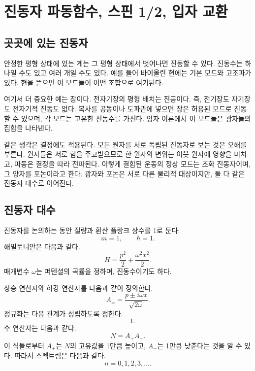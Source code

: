 \chapter{진동자 파동함수, 스핀 1/2, 입자 교환}

\section{곳곳에 있는 진동자}

안정한 평형 상태에 있는 계는 그 평형 상태에서 벗어나면 진동할 수 있다. 진동수는 하나일 수도 있고 여러 개일 수도 있다. 예를 들어 바이올린 현에는 기본 모드와 고조파가 있다. 현을 뜯으면 이 모드들이 어떤 조합으로 여기된다.

여기서 더 중요한 예는 장이다. 전자기장의 평형 배치는 진공이다. 즉, 전기장도 자기장도 전자기적 진동도 없다. 복사를 공동이나 도파관에 넣으면 장은 허용된 모드로 진동할 수 있으며, 각 모드는 고유한 진동수를 가진다. 양자 이론에서 이 모드들은 광자들의 집합을 나타낸다.

같은 생각은 결정에도 적용된다. 모든 원자를 서로 독립된 진동자로 보는 것은 오해를 부른다. 원자들은 서로 힘을 주고받으므로 한 원자의 변위는 이웃 원자에 영향을 미치고, 파동은 결정을 따라 전파된다. 이렇게 결합된 운동의 정상 모드는 조화 진동자이며, 그 양자를 포논이라고 한다. 광자와 포논은 서로 다른 물리적 대상이지만, 둘 다 같은 진동자 대수로 이어진다.

\section{진동자 대수}

진동자를 논의하는 동안 질량과 환산 플랑크 상수를 1로 둔다:
\[
m=1,\qquad \hbar=1.
\]
해밀토니안은 다음과 같다.
\begin{equation}
H=\frac{p^{2}}{2}+\frac{\omega^{2}x^{2}}{2}.
\end{equation}
매개변수 \(\omega\)는 퍼텐셜의 곡률을 정하며, 진동수이기도 하다.

상승 연산자와 하강 연산자를 다음과 같이 정의한다.
\begin{equation}
A_{\pm}=\frac{p\pm i\omega x}{\sqrt{2\omega}}.
\end{equation}
정규화는 다음 관계가 성립하도록 정한다.
\begin{equation}
[A_{-},A_{+}]=1.
\end{equation}
수 연산자는 다음과 같다.
\begin{equation}
N=A_{+}A_{-}.
\end{equation}
이 식들로부터 \(A_{+}\)는 \(N\)의 고유값을 1만큼 높이고, \(A_{-}\)는 1만큼 낮춘다는 것을 알 수 있다. 따라서 스펙트럼은 다음과 같다.
\begin{equation}
n=0,1,2,3,\ldots .
\end{equation}

